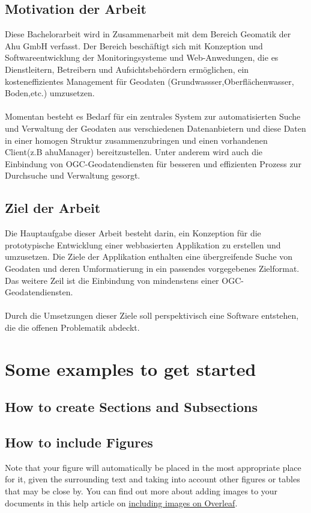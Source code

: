 \documentclass[a4paper,12pt]{scrreprt}
\begin{document}
\section{Motivation der Arbeit}
Diese Bachelorarbeit wird in Zusammenarbeit mit dem Bereich Geomatik der Ahu GmbH verfasst. Der Bereich beschäftigt sich mit Konzeption und Softwareentwicklung der Monitoringsysteme und Web-Anwedungen, die es Dienstleitern, Betreibern und Aufsichtsbehördern ermöglichen, ein kosteneffizientes Management für Geodaten (Grundwassser,Oberflächenwasser, Boden,etc.) umzusetzen. \\ \\
Momentan besteht es Bedarf für ein zentrales System zur automatisierten Suche und Verwaltung der Geodaten aus verschiedenen Datenanbietern und diese Daten in einer homogen Struktur zusammenzubringen und einen vorhandenen Client(z.B ahuManager) bereitzustellen. Unter anderem  wird auch die Einbindung von OGC-Geodatendiensten für besseren und effizienten Prozess zur Durchsuche und Verwaltung gesorgt. 

\section{Ziel der Arbeit}
Die Hauptaufgabe dieser Arbeit besteht darin, ein Konzeption für die prototypische Entwicklung einer webbasierten Applikation zu erstellen und umzusetzen. Die Ziele der Applikation enthalten eine übergreifende Suche von Geodaten und deren Umformatierung in ein passendes vorgegebenes Zielformat. Das weitere Zeil ist die Einbindung von mindenstens einer OGC-Geodatendiensten.\\ \\ Durch die Umsetzungen dieser Ziele soll perspektivisch eine Software entstehen, die die offenen Problematik abdeckt.

\chapter{Some examples to get started}
\section{How to create Sections and Subsections}

\section{How to include Figures}
Note that your figure will automatically be placed in the most appropriate place for it, given the surrounding text and taking into account other figures or tables that may be close by. You can find out more about adding images to your documents in this help article on \href{https://www.overleaf.com/learn/how-to/Including_images_on_Overleaf}{including images on Overleaf}.
\end{document}
